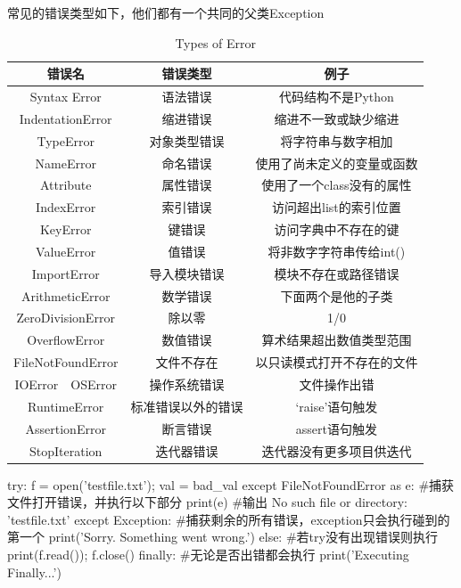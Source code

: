 常见的错误类型如下，他们都有一个共同的父类Exception
\begin{table}[htb]
  \centering  
  \caption{Types of Error}
  \label{tab: types of error}
  \begin{tabular}{ccc}
    \toprule[1.5pt]
    错误名               & 错误类型      & 例子              \\
    \midrule
    Syntax Error      & 语法错误      & 代码结构不是Python    \\
    IndentationError  & 缩进错误      & 缩进不一致或缺少缩进      \\
    TypeError         & 对象类型错误    & 将字符串与数字相加       \\
    NameError         & 命名错误      & 使用了尚未定义的变量或函数   \\
    Attribute         & 属性错误      & 使用了一个class没有的属性 \\
    IndexError        & 索引错误      & 访问超出list的索引位置   \\
    KeyError          & 键错误       & 访问字典中不存在的键      \\
    ValueError        & 值错误       & 将非数字字符串传给int()  \\
    ImportError       & 导入模块错误    & 模块不存在或路径错误      \\
    ArithmeticError   & 数学错误      & 下面两个是他的子类       \\
    ZeroDivisionError & 除以零       & 1/0             \\
    OverflowError     & 数值错误      & 算术结果超出数值类型范围    \\
    FileNotFoundError & 文件不存在     & 以只读模式打开不存在的文件   \\
    IOError~~OSError  & 操作系统错误    & 文件操作出错          \\
    RuntimeError      & 标准错误以外的错误 & `raise'语句触发     \\
    AssertionError    & 断言错误      & assert语句触发      \\
    StopIteration     & 迭代器错误     & 迭代器没有更多项目供迭代    \\
    \bottomrule[1.5pt]
  \end{tabular}
\end{table}

\begin{codeblock}[language=python, caption={try except}]
  try:
  f = open('testfile.txt'); val = bad_val
  except FileNotFoundError as e: #捕获文件打开错误，并执行以下部分
  print(e) #输出 No such file or directory: 'testfile.txt'
  except Exception: #捕获剩余的所有错误，exception只会执行碰到的第一个
  print('Sorry. Something went wrong.')
  else: #若try没有出现错误则执行
  print(f.read()); f.close()
  finally: #无论是否出错都会执行
  print('Executing Finally...')
\end{codeblock}

